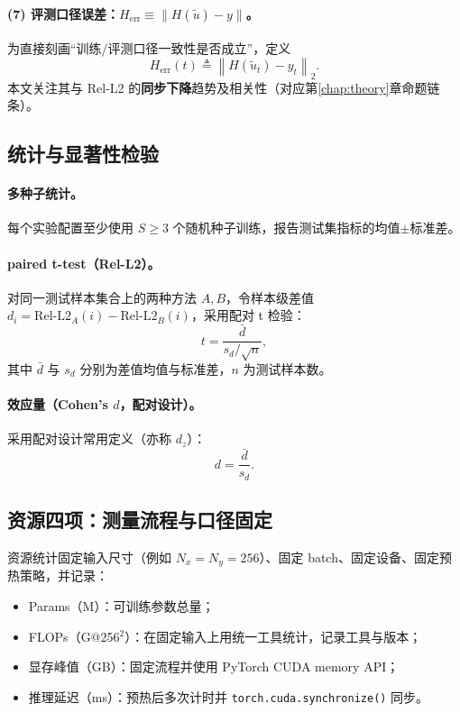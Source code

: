 \paragraph{(7) 评测口径误差：$H_{\mathrm{err}} \equiv \|H(\tilde u)-y\|$。}
为直接刻画“训练/评测口径一致性是否成立”，定义
\begin{equation}
H_{\mathrm{err}}(t) \triangleq \left\|H(\tilde u_t)-y_t\right\|_2.
\label{eq:Herr_ch6}
\end{equation}
本文关注其与 Rel-L2 的\textbf{同步下降}趋势及相关性（对应第\ref{chap:theory}章命题链条）。

\subsection{统计与显著性检验}\label{sec:stats_ch6}

\paragraph{多种子统计。}
每个实验配置至少使用 $S\ge 3$ 个随机种子训练，报告测试集指标的均值$\pm$标准差。

\paragraph{paired t-test（Rel-L2）。}
对同一测试样本集合上的两种方法 $A,B$，令样本级差值 $d_i = \mathrm{Rel\mbox{-}L2}_A(i)-\mathrm{Rel\mbox{-}L2}_B(i)$，采用配对 t 检验\cite{student1908probable}：
\[
t=\frac{\bar d}{s_d/\sqrt{n}},
\]
其中 $\bar d$ 与 $s_d$ 分别为差值均值与标准差，$n$ 为测试样本数。

\paragraph{效应量（Cohen's $d$，配对设计）。}
采用配对设计常用定义（亦称 $d_z$）\cite{cohen1988power}：
\begin{equation}
d = \frac{\bar d}{s_d}.
\label{eq:cohen_d}
\end{equation}

\subsection{资源四项：测量流程与口径固定}\label{sec:resources}

资源统计固定输入尺寸（例如 $N_x=N_y=256$）、固定 batch、固定设备、固定预热策略，并记录：
\begin{itemize}
  \item Params（M）：可训练参数总量；
  \item FLOPs（G@256$^2$）：在固定输入上用统一工具统计，记录工具与版本；
  \item 显存峰值（GB）：固定流程并使用 PyTorch CUDA memory API\cite{pytorch_cuda_memory,pytorch_max_memory_allocated}；
  \item 推理延迟（ms）：预热后多次计时并 \texttt{torch.cuda.synchronize()} 同步。
\end{itemize}

